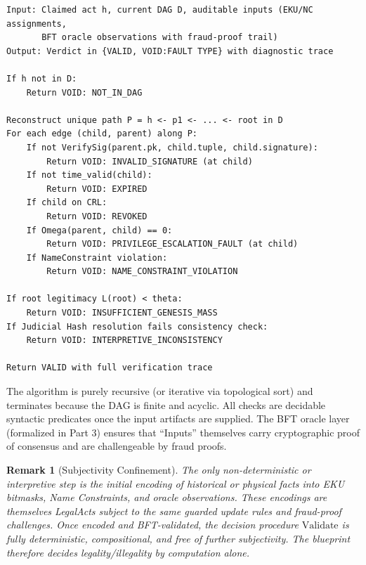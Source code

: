 \documentclass[11pt,a4paper]{article}
\newtheorem{remark}[theorem]{Remark}
\begin{document}
\begin{lstlisting}[caption={Validate(h, \protect$\mathcal{D}$\protect, Inputs)}, label={alg:validate}]
Input: Claimed act h, current DAG D, auditable inputs (EKU/NC assignments, 
       BFT oracle observations with fraud-proof trail)
Output: Verdict in {VALID, VOID:FAULT TYPE} with diagnostic trace

If h not in D:
    Return VOID: NOT_IN_DAG

Reconstruct unique path P = h <- p1 <- ... <- root in D
For each edge (child, parent) along P:
    If not VerifySig(parent.pk, child.tuple, child.signature):
        Return VOID: INVALID_SIGNATURE (at child)
    If not time_valid(child):
        Return VOID: EXPIRED
    If child on CRL:
        Return VOID: REVOKED
    If Omega(parent, child) == 0:
        Return VOID: PRIVILEGE_ESCALATION_FAULT (at child)
    If NameConstraint violation:
        Return VOID: NAME_CONSTRAINT_VIOLATION

If root legitimacy L(root) < theta:
    Return VOID: INSUFFICIENT_GENESIS_MASS
If Judicial Hash resolution fails consistency check:
    Return VOID: INTERPRETIVE_INCONSISTENCY

Return VALID with full verification trace
\end{lstlisting}

The algorithm is purely recursive (or iterative via topological sort) and terminates because the DAG is finite and acyclic. All checks are decidable syntactic predicates once the input artifacts are supplied. The BFT oracle layer (formalized in Part 3) ensures that ``Inputs'' themselves carry cryptographic proof of consensus and are challengeable by fraud proofs.

\begin{remark}[Subjectivity Confinement]
The only non-deterministic or interpretive step is the initial encoding of historical or physical facts into EKU bitmasks, Name Constraints, and oracle observations. These encodings are themselves LegalActs subject to the same guarded update rules and fraud-proof challenges. Once encoded and BFT-validated, the decision procedure \(\text{Validate}\) is fully deterministic, compositional, and free of further subjectivity. The blueprint therefore decides legality/illegality by computation alone.
\end{remark}
\end{document}
